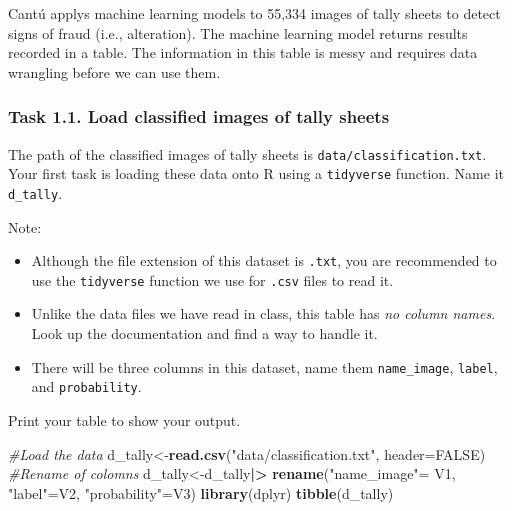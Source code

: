 \documentclass[
]{article}
\newenvironment{Shaded}{\begin{snugshade}}{\end{snugshade}}
\newcommand{\AttributeTok}[1]{\textcolor[rgb]{0.13,0.29,0.53}{#1}}
\newcommand{\CommentTok}[1]{\textcolor[rgb]{0.56,0.35,0.01}{\textit{#1}}}
\newcommand{\ConstantTok}[1]{\textcolor[rgb]{0.56,0.35,0.01}{#1}}
\newcommand{\FunctionTok}[1]{\textcolor[rgb]{0.13,0.29,0.53}{\textbf{#1}}}
\newcommand{\NormalTok}[1]{#1}
\newcommand{\OtherTok}[1]{\textcolor[rgb]{0.56,0.35,0.01}{#1}}
\newcommand{\SpecialCharTok}[1]{\textcolor[rgb]{0.81,0.36,0.00}{\textbf{#1}}}
\newcommand{\StringTok}[1]{\textcolor[rgb]{0.31,0.60,0.02}{#1}}
\begin{document}
Cantú applys machine learning models to 55,334 images of tally sheets to
detect signs of fraud (i.e., alteration). The machine learning model
returns results recorded in a table. The information in this table is
messy and requires data wrangling before we can use them.

\hypertarget{task-1.1.-load-classified-images-of-tally-sheets}{%
\subsubsection{Task 1.1. Load classified images of tally
sheets}\label{task-1.1.-load-classified-images-of-tally-sheets}}

The path of the classified images of tally sheets is
\texttt{data/classification.txt}. Your first task is loading these data
onto R using a \texttt{tidyverse} function. Name it \texttt{d\_tally}.

Note:

\begin{itemize}
\item
  Although the file extension of this dataset is \texttt{.txt}, you are
  recommended to use the \texttt{tidyverse} function we use for
  \texttt{.csv} files to read it.
\item
  Unlike the data files we have read in class, this table has \emph{no
  column names}. Look up the documentation and find a way to handle it.
\item
  There will be three columns in this dataset, name them
  \texttt{name\_image}, \texttt{label}, and \texttt{probability}.
\end{itemize}

Print your table to show your output.

\begin{Shaded}
\begin{Highlighting}[]
\CommentTok{\#Load the data }
\NormalTok{d\_tally}\OtherTok{\textless{}{-}}\FunctionTok{read.csv}\NormalTok{(}\StringTok{"data/classification.txt"}\NormalTok{, }\AttributeTok{header=}\ConstantTok{FALSE}\NormalTok{)}
\CommentTok{\#Rename of colomns }
\NormalTok{d\_tally}\OtherTok{\textless{}{-}}\NormalTok{d\_tally}\SpecialCharTok{|\textgreater{}}
       \FunctionTok{rename}\NormalTok{(}\StringTok{"name\_image"}\OtherTok{=}\NormalTok{ V1, }\StringTok{"label"}\OtherTok{=}\NormalTok{V2, }\StringTok{"probability"}\OtherTok{=}\NormalTok{V3)}
\FunctionTok{library}\NormalTok{(dplyr)}
\FunctionTok{tibble}\NormalTok{(d\_tally)}
\end{Highlighting}
\end{Shaded}
\end{document}
